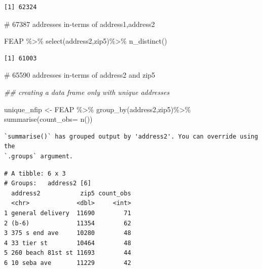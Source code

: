 \documentclass[
  letterpaper,
  DIV=11,
  numbers=noendperiod]{scrartcl}
\newenvironment{Shaded}{\begin{snugshade}}{\end{snugshade}}
\newcommand{\AttributeTok}[1]{\textcolor[rgb]{0.40,0.45,0.13}{#1}}
\newcommand{\CommentTok}[1]{\textcolor[rgb]{0.37,0.37,0.37}{#1}}
\newcommand{\DocumentationTok}[1]{\textcolor[rgb]{0.37,0.37,0.37}{\textit{#1}}}
\newcommand{\FunctionTok}[1]{\textcolor[rgb]{0.28,0.35,0.67}{#1}}
\newcommand{\NormalTok}[1]{\textcolor[rgb]{0.00,0.23,0.31}{#1}}
\newcommand{\OtherTok}[1]{\textcolor[rgb]{0.00,0.23,0.31}{#1}}
\newcommand{\SpecialCharTok}[1]{\textcolor[rgb]{0.37,0.37,0.37}{#1}}
\begin{document}
\begin{verbatim}
[1] 62324
\end{verbatim}

\begin{Shaded}
\begin{Highlighting}[]
\CommentTok{\# 67387 addresses in{-}terms of address1,address2}

\NormalTok{FEAP }\SpecialCharTok{\%\textgreater{}\%} 
  \FunctionTok{select}\NormalTok{(address2,zip5)}\SpecialCharTok{\%\textgreater{}\%}
  \FunctionTok{n\_distinct}\NormalTok{()}
\end{Highlighting}
\end{Shaded}

\begin{verbatim}
[1] 61003
\end{verbatim}

\begin{Shaded}
\begin{Highlighting}[]
\CommentTok{\# 65590 addresses in{-}terms of address2 and zip5}

\DocumentationTok{\#\# creating a data frame only with unique addresses }

\NormalTok{unique\_nfip }\OtherTok{\textless{}{-}}\NormalTok{  FEAP }\SpecialCharTok{\%\textgreater{}\%} 
  \FunctionTok{group\_by}\NormalTok{(address2,zip5)}\SpecialCharTok{\%\textgreater{}\%} 
  \FunctionTok{summarise}\NormalTok{(}\AttributeTok{count\_obs=} \FunctionTok{n}\NormalTok{())}
\end{Highlighting}
\end{Shaded}

\begin{verbatim}
`summarise()` has grouped output by 'address2'. You can override using the
`.groups` argument.
\end{verbatim}

\begin{Shaded}
\end{Shaded}

\begin{verbatim}
# A tibble: 6 x 3
# Groups:   address2 [6]
  address2           zip5 count_obs
  <chr>             <dbl>     <int>
1 general delivery  11690        71
2 (b-6)             11354        62
3 375 s end ave     10280        48
4 33 tier st        10464        48
5 260 beach 81st st 11693        44
6 10 seba ave       11229        42
\end{verbatim}
\end{document}
